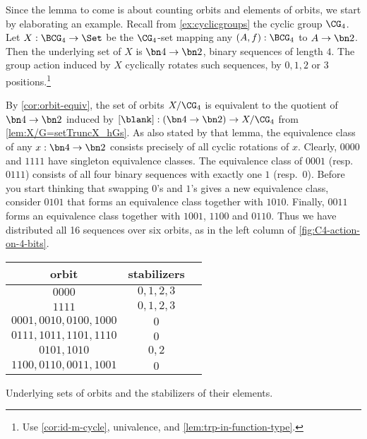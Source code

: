 \begin{example}\label{exa:prep-burnside}
Since the lemma to come is about counting orbits and
elements of orbits, we start by elaborating an example.
Recall from \cref{ex:cyclicgroups} the cyclic group $\CG_4$.
Let $X: \BCG_4\to\Set$ be the $\CG_4$-set mapping any $(A,f):\BCG_4$
to $A\to\bn2$. Then the underlying set of $X$ is $\bn4\to\bn2$,
\ie binary sequences of length $4$. The group action induced by $X$
cyclically rotates such sequences, by $0,1,2$ or $3$ positions.\footnote{%
Use \cref{cor:id-m-cycle}, univalence, and \cref{lem:trp-in-function-type}.}

By \cref{cor:orbit-equiv}, the set of orbits $X/\CG_4$ is
equivalent to the quotient of $\bn4\to\bn2$ induced by 
$[\blank] : (\bn4\to\bn2) \to X/\CG_4$ from \cref{lem:X/G=setTruncX_hGs}.
As also stated by that lemma, the equivalence class of any $x:\bn4\to\bn2$
consists precisely of all cyclic rotations of $x$. Clearly, 
$0000$ and $1111$ have singleton equivalence classes.
The equivalence class of $0001$ (resp.\ $0111$) consists of all four binary 
sequences with exactly one $1$ (resp.\ $0$).  Before you start thinking that
swapping $0$'s and $1$'s gives a new equivalence class, consider 
$0101$ that forms an equivalence class together with $1010$.
Finally, $0011$ forms an equivalence class together with $1001$,
$1100$ and $0110$. Thus we have distributed all 16 sequences over
six orbits, as in the left column of \cref{fig:C4-action-on-4-bits}.

\begin{margintable}\label{fig:C4-action-on-4-bits}
  \footnotesize
\begin{tabular}{ccc} \toprule
 orbit & stabilizers \\ \midrule
 $0000$ & $0,1,2,3$ \\
 $1111$ & $0,1,2,3$ \\
 $0001,0010,0100,1000$ & $0$ \\
 $0111,1011,1101,1110$ & $0$ \\
 $0101,1010$ & $0,2$ \\
 $1100,0110,0011,1001$ & $0$ \\ \bottomrule
\end{tabular}
\caption{\label{fig:C4-action-on-4-bits}
Underlying sets of orbits and the stabilizers of their elements.}
\end{margintable}


\end{example}
